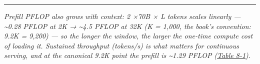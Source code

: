 \begin{center}\rule{0.5\linewidth}{0.5pt}\end{center}

\emph{Prefill PFLOP also grows with context: 2 ×70B × L tokens scales
linearly --- \textasciitilde0.28 PFLOP at 2K → \textasciitilde4.5 PFLOP
at 32K (K = 1,000, the book's convention: 9.2K = 9,200) --- so the
longer the window, the larger the one-time compute cost of loading it.
Sustained throughput (tokens/s) is what matters for continuous serving,
and at the canonical 9.2K point the prefill is \textasciitilde1.29 PFLOP
(\hyperref[tab:8.1]{Table 8-1}).}
